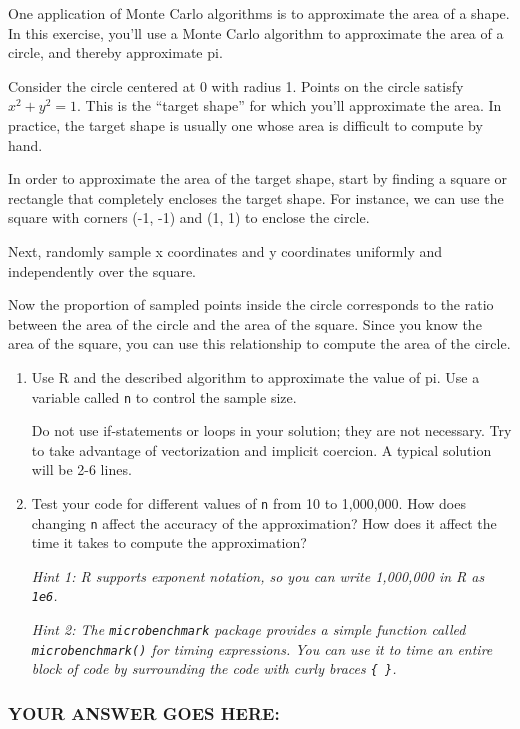 \documentclass[
]{article}
\begin{document}
One application of Monte Carlo algorithms is to approximate the area of
a shape. In this exercise, you'll use a Monte Carlo algorithm to
approximate the area of a circle, and thereby approximate pi.

Consider the circle centered at 0 with radius 1. Points on the circle
satisfy \(x^2 + y^2 = 1\). This is the ``target shape'' for which you'll
approximate the area. In practice, the target shape is usually one whose
area is difficult to compute by hand.

In order to approximate the area of the target shape, start by finding a
square or rectangle that completely encloses the target shape. For
instance, we can use the square with corners (-1, -1) and (1, 1) to
enclose the circle.

Next, randomly sample x coordinates and y coordinates uniformly and
independently over the square.

Now the proportion of sampled points inside the circle corresponds to
the ratio between the area of the circle and the area of the square.
Since you know the area of the square, you can use this relationship to
compute the area of the circle.

\begin{enumerate}
\def\labelenumi{\arabic{enumi}.}
\item
  Use R and the described algorithm to approximate the value of pi. Use
  a variable called \texttt{n} to control the sample size.

  Do not use if-statements or loops in your solution; they are not
  necessary. Try to take advantage of vectorization and implicit
  coercion. A typical solution will be 2-6 lines.
\item
  Test your code for different values of \texttt{n} from 10 to
  1,000,000. How does changing \texttt{n} affect the accuracy of the
  approximation? How does it affect the time it takes to compute the
  approximation?

  \emph{Hint 1: R supports exponent notation, so you can write 1,000,000
  in R as \texttt{1e6}.}

  \emph{Hint 2: The \texttt{microbenchmark} package provides a simple
  function called \texttt{microbenchmark()} for timing expressions. You
  can use it to time an entire block of code by surrounding the code
  with curly braces \texttt{\{\ \}}.}
\end{enumerate}

\hypertarget{your-answer-goes-here-3}{%
\subsubsection{YOUR ANSWER GOES HERE:}\label{your-answer-goes-here-3}}
\end{document}
